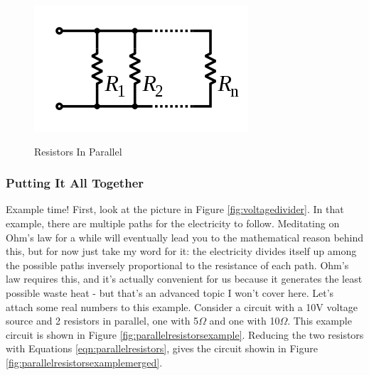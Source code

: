 \begin{figure}[h]
\centering
\includegraphics[scale=0.75]{parallelresistors.png}
\label{fig:parallelresistors}
\caption{Resistors In Parallel}
\end{figure}

\subsubsection{Putting It All Together}

Example time! First, look at the picture in Figure \ref{fig:voltagedivider}. In that example, there are multiple paths for the electricity to follow. Meditating on Ohm's law for a while will eventually lead you to the mathematical reason behind this, but for now just take my word for it: the electricity divides itself up among the possible paths inversely proportional to the resistance of each path. Ohm's law requires this, and it's actually convenient for us because it generates the least possible waste heat - but that's an advanced topic I won't cover here. Let's attach some real numbers to this example. Consider a circuit with a 10V voltage source and 2 resistors in parallel, one with 5$\Omega$ and one with 10$\Omega$. This example circuit is shown in Figure \ref{fig:parallelresistorsexample}. Reducing the two resistors with Equations \ref{eqn:parallelresistors}, gives the circuit showin in Figure \ref{fig:parallelresistorsexamplemerged}.


